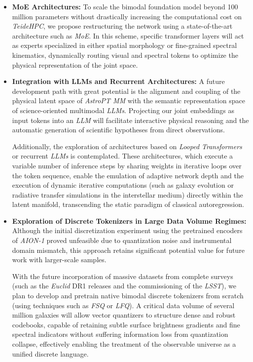 \begin{itemize}
	\item \textbf{\gls{MoE} Architectures:} 
	To scale the bimodal foundation model beyond 100 million parameters without drastically increasing the computational cost on \textit{TeideHPC}, we propose restructuring the network using a state-of-the-art architecture such as \textit{\gls{MoE}}. In this scheme, specific transformer layers will act as experts specialized in either spatial morphology or fine-grained spectral kinematics, dynamically routing visual and spectral tokens to optimize the physical representation of the joint space.
	
	\item \textbf{Integration with LLMs and Recurrent Architectures:} 
	A future development path with great potential is the alignment and coupling of the physical latent space of \textit{AstroPT MM} with the semantic representation space of science-oriented multimodal \textit{\glspl{LLM}}. Projecting our joint embeddings as input tokens into an \textit{\gls{LLM}} will facilitate interactive physical reasoning and the automatic generation of scientific hypotheses from direct observations. 

	Additionally, the exploration of architectures based on \textit{Looped Transformers} or recurrent \textit{\glspl{LLM}} is contemplated. These architectures, which execute a variable number of inference steps by sharing weights in iterative loops over the token sequence, enable the emulation of adaptive network depth and the execution of dynamic iterative computations (such as galaxy evolution or radiative transfer simulations in the interstellar medium) directly within the latent manifold, transcending the static paradigm of classical autoregression.
	
	\item \textbf{Exploration of Discrete Tokenizers in Large Data Volume Regimes:} 
	Although the initial discretization experiment using the pretrained encoders of \textit{AION-1} proved unfeasible due to quantization noise and instrumental domain mismatch, this approach retains significant potential value for future work with larger-scale samples. 

	With the future incorporation of massive datasets from complete surveys (such as the \textit{Euclid} DR1 releases and the commissioning of the \textit{\gls{LSST}}), we plan to develop and pretrain native bimodal discrete tokenizers from scratch (using techniques such as \textit{\gls{FSQ}} or \textit{\gls{LFQ}}). A critical data volume of several million galaxies will allow vector quantizers to structure dense and robust codebooks, capable of retaining subtle surface brightness gradients and fine spectral indicators without suffering information loss from quantization collapse, effectively enabling the treatment of the observable universe as a unified discrete language.
	

\end{itemize}
